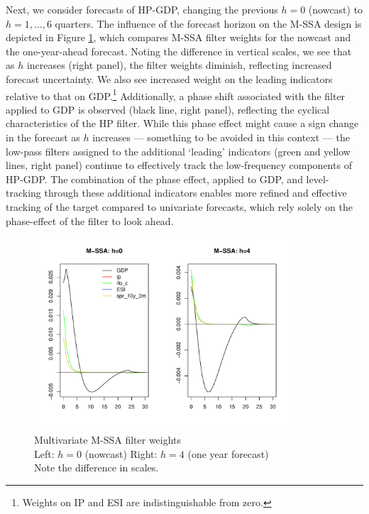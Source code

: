 \documentclass[11pt,a4paper]{article}
\begin{document}
Next, we 
consider forecasts of HP-GDP, changing the previous
$h=0$ (nowcast) to $h=1,...,6$ quarters. 
The influence of the forecast horizon on the M-SSA design is depicted in Figure \ref{bk_h}, which compares M-SSA filter weights for the nowcast and the one-year-ahead forecast. Noting the difference in vertical scales, we see that as $h$ increases (right panel), the filter weights diminish, reflecting increased forecast uncertainty. We also see increased weight on the leading indicators relative to that on GDP.\footnote{Weights on IP and ESI are indistinguishable from zero.} Additionally, a phase shift associated with the filter applied to GDP is observed (black line, right panel), reflecting the cyclical characteristics of the HP filter. While this phase effect might cause a sign change in the forecast as $h$ increases — something to be avoided in this context — the low-pass filters assigned to the additional  `leading' indicators (green and yellow lines, right panel) continue to effectively track the low-frequency components of HP-GDP. The combination of the phase effect, applied to GDP, and level-tracking through these additional indicators enables more refined and effective tracking of the target compared to univariate forecasts, which rely solely on the phase-effect of the filter to look ahead.

\begin{figure}[H]
    \begin{center}
        \includegraphics[width=0.85\textwidth]{./Figures/bk_h.pdf}
        \caption{Multivariate M-SSA filter weights\\
        Left: $h=0$ (nowcast) \qquad Right: $h=4$ (one year forecast)\\
        Note the difference in scales.
        \label{bk_h}}
    \end{center}
\end{figure}
\end{document}
